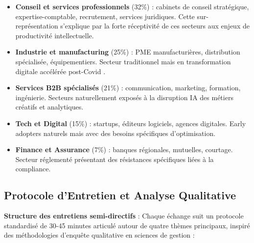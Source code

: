 \begin{itemize}
    \item \textbf{Conseil et services professionnels} (32\%) : cabinets de conseil stratégique, expertise-comptable, recrutement, services juridiques. Cette sur-représentation s'explique par la forte réceptivité de ces secteurs aux enjeux de productivité intellectuelle.
    \item \textbf{Industrie et manufacturing} (25\%) : PME manufacturières, distribution spécialisée, équipementiers. Secteur traditionnel mais en transformation digitale accélérée post-Covid \cite{mckinsey2024industry}.
    \item \textbf{Services B2B spécialisés} (21\%) : communication, marketing, formation, ingénierie. Secteurs naturellement exposés à la disruption IA des métiers créatifs et analytiques.
    \item \textbf{Tech et Digital} (15\%) : startups, éditeurs logiciels, agences digitales. Early adopters naturels mais avec des besoins spécifiques d'optimisation.
    \item \textbf{Finance et Assurance} (7\%) : banques régionales, mutuelles, courtage. Secteur réglementé présentant des résistances spécifiques liées à la compliance.
\end{itemize}

\subsection{Protocole d'Entretien et Analyse Qualitative}

\textbf{Structure des entretiens semi-directifs} : Chaque échange suit un protocole standardisé de 30-45 minutes articulé autour de quatre thèmes principaux, inspiré des méthodologies d'enquête qualitative en sciences de gestion \cite{miles2014qualitative} :

